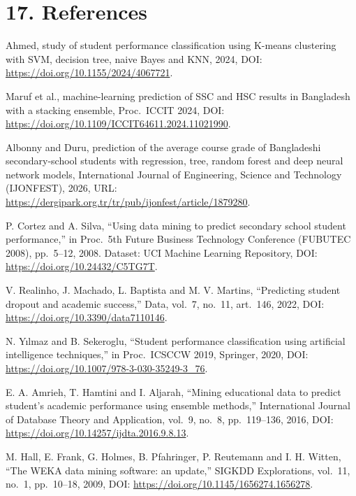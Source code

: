 \documentclass[11pt,a4paper]{article}
\begin{document}
\section{17. References}
{\small
\begin{enumerate}[label={[\arabic*]},leftmargin=22pt,itemsep=2pt]
\item Ahmed, study of student performance classification using K-means clustering with SVM, decision tree, naive Bayes and KNN, 2024, DOI: \url{https://doi.org/10.1155/2024/4067721}.
\item Maruf et al., machine-learning prediction of SSC and HSC results in Bangladesh with a stacking ensemble, Proc.\ ICCIT 2024, DOI: \url{https://doi.org/10.1109/ICCIT64611.2024.11021990}.
\item Albonny and Duru, prediction of the average course grade of Bangladeshi secondary-school students with regression, tree, random forest and deep neural network models, International Journal of Engineering, Science and Technology (IJONFEST), 2026, URL: \url{https://dergipark.org.tr/tr/pub/ijonfest/article/1879280}.
\item P. Cortez and A. Silva, ``Using data mining to predict secondary school student performance,'' in Proc.\ 5th Future Business Technology Conference (FUBUTEC 2008), pp.\ 5--12, 2008. Dataset: UCI Machine Learning Repository, DOI: \url{https://doi.org/10.24432/C5TG7T}.
\item V. Realinho, J. Machado, L. Baptista and M. V. Martins, ``Predicting student dropout and academic success,'' Data, vol.\ 7, no.\ 11, art.\ 146, 2022, DOI: \url{https://doi.org/10.3390/data7110146}.
\item N. Yılmaz and B. Sekeroglu, ``Student performance classification using artificial intelligence techniques,'' in Proc.\ ICSCCW 2019, Springer, 2020, DOI: \url{https://doi.org/10.1007/978-3-030-35249-3_76}.
\item E. A. Amrieh, T. Hamtini and I. Aljarah, ``Mining educational data to predict student's academic performance using ensemble methods,'' International Journal of Database Theory and Application, vol.\ 9, no.\ 8, pp.\ 119--136, 2016, DOI: \url{https://doi.org/10.14257/ijdta.2016.9.8.13}.
\item M. Hall, E. Frank, G. Holmes, B. Pfahringer, P. Reutemann and I. H. Witten, ``The WEKA data mining software: an update,'' SIGKDD Explorations, vol.\ 11, no.\ 1, pp.\ 10--18, 2009, DOI: \url{https://doi.org/10.1145/1656274.1656278}.

\end{enumerate}}
\end{document}

